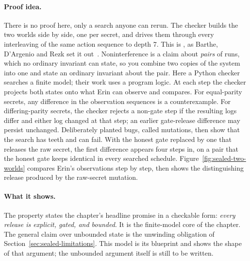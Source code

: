 \documentclass[11pt,a4paper]{article}
\theoremstyle{definition}
\begin{document}
\paragraph{Proof idea.}
There is no proof here, only a search anyone can rerun. The checker builds
the two worlds side by side, one per secret, and drives them through every
interleaving of the same action sequence to depth 7. This is
, as Barthe, D'Argenio and Rezk set it
out~. Noninterference is a claim about \emph{pairs} of runs,
which no ordinary invariant can state, so you combine two copies of the system
into one and state an ordinary invariant about the pair. Here a Python checker
searches a finite model; their work uses a program logic.
At each step the checker projects both states onto what Erin can observe and
compares. For equal-parity secrets, any difference in the observation sequences
is a counterexample. For differing-parity secrets, the checker rejects a
non-gate step if the resulting logs differ and either log changed at that step;
an earlier gate-release difference may persist unchanged. Deliberately
planted bugs, called mutations, then show that the search has teeth and can
fail. With the
honest gate replaced by one that releases the raw secret, the first difference
appears four steps in, on a pair that the honest gate keeps identical in every
searched schedule. Figure~\ref{fig:sealed-two-worlds}
compares Erin's observations step by step, then shows the distinguishing
release produced by the raw-secret mutation.





\paragraph{What it shows.} %
The property states the chapter's headline promise in a checkable form:
\emph{every release is explicit, gated, and bounded}. It is the finite-model
core of the chapter. The general claim over unbounded state is the unwinding
obligation of Section~\ref{sec:sealed-limitations}. This model is its
blueprint and shows the shape of that argument; the unbounded argument itself
is still to be written.
\end{document}
